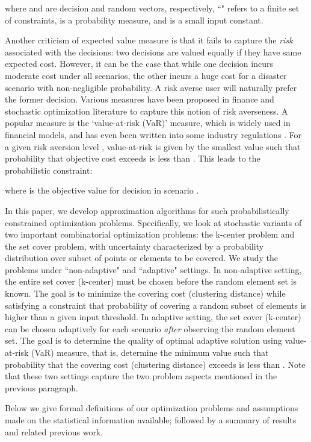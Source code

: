 \documentclass[11pt,onecolumn]{article}
\newcommand{\newtext}[1]{{#1}}
\begin{document}
	where  and  are decision and random vectors, respectively, ``" refers to a finite set of constraints,  is a probability measure, and  is a small input constant.

Another criticism of expected value measure is that it fails to capture the {\it risk} associated with the decisions: two decisions are valued equally if they have same expected cost. However, it can be the case that while one decision incurs moderate cost under all scenarios, the other incurs a huge cost for a disaster scenario with non-negligible probability. A risk averse user will naturally prefer the former decision. 
Various measures have been proposed in finance and stochastic optimization literature to capture this notion of risk averseness. A popular measure is the `value-at-risk (VaR)' measure, which is widely used in financial models, and has even been written into some industry regulations \cite{VaR1, VaR2}. For a given risk aversion level , value-at-risk is given by the smallest value  such that probability that objective cost exceeds  is less than . This leads to the probabilistic constraint:

where  is the objective value for decision  in scenario .

\newtext{In this paper, we develop approximation algorithms for such probabilistically constrained optimization problems.
Specifically, we look at stochastic variants of two important combinatorial optimization problems: the k-center problem and the set cover problem, with uncertainty characterized by a probability distribution over subset of points or elements to be covered. We study the problems under ``non-adaptive" and ``adaptive" settings.
In non-adaptive
setting, the entire set cover (k-center) must be chosen before the random element set is known. The goal is to minimize the covering cost (clustering distance) while satisfying a constraint that probability of covering a random subset of elements is higher than a given input threshold. In adaptive setting, the set cover (k-center) can be chosen adaptively for each scenario {\it after} observing the random element set. The goal is to determine the quality of optimal adaptive solution using value-at-risk (VaR) measure, that is, determine the minimum value  such that probability that the covering cost (clustering distance) exceeds  is less than . Note that these two settings capture the two problem aspects mentioned in the previous paragraph.
}

Below we give formal definitions of our optimization problems and assumptions made on the statistical information available; followed by a summary of results and related previous work.
\end{document}

